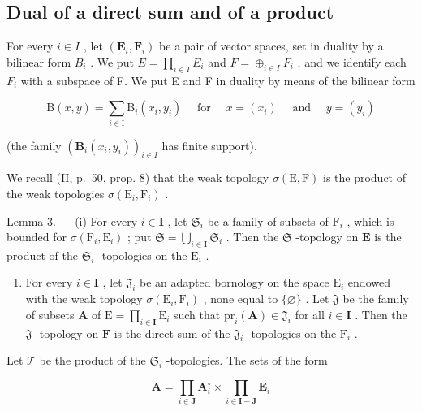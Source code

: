 \subsection{Dual of a direct sum and of a product}

For every \(i \in I\) , let \((\mathbf{E}_{i}, \mathbf{F}_{i})\) be a pair of vector spaces, set in duality by a bilinear form \(B_{i}\) . We put \(E = \prod_{i \in I} E_{i}\) and \(F = \oplus_{i \in I} F_{i}\) , and we identify each \(F_{i}\) with a subspace of F. We put E and F in duality by means of the bilinear form

\[
\mathrm{B} (x, y) = \sum_ {i \in \mathrm{I}} \mathrm{B} _ {i} \left(x _ {i}, y _ {i}\right) \quad \text { for } \quad x = \left(x _ {i}\right) \quad \text { and } \quad y = \left(y _ {i}\right)\tag{8}
\]

(the family \((\mathbf{B}_i(x_i, y_i))_{i \in I}\) has finite support).

We recall (II, p.~50, prop. 8) that the weak topology \(\sigma(\mathrm{E},\mathrm{F})\) is the product of the weak topologies \(\sigma(\mathrm{E}_i,\mathrm{F}_i)\) .

Lemma 3. --- (i) For every \(i \in \mathbf{I}\) , let \(\mathfrak{S}_i\) be a family of subsets of \(\mathrm{F}_i\) , which is bounded for \(\sigma(\mathrm{F}_i, \mathrm{E}_i)\) ; put \(\mathfrak{S} = \bigcup_{i \in \mathbf{I}} \mathfrak{S}_i\) . Then the \(\mathfrak{S}\) -topology on \(\mathbf{E}\) is the product of the \(\mathfrak{S}_i\) -topologies on the \(\mathrm{E}_i\) .

\begin{enumerate}
\def\labelenumi{(\roman{enumi})}
\setcounter{enumi}{1}
\tightlist
\item
  For every \(i \in \mathbf{I}\) , let \(\mathfrak{J}_i\) be an adapted bornology on the space \(\mathrm{E}_i\) endowed with the weak topology \(\sigma(\mathrm{E}_i, \mathrm{F}_i)\) , none equal to \(\{\varnothing\}\) . Let \(\mathfrak{J}\) be the family of subsets \(\mathbf{A}\) of \(\mathrm{E} = \prod_{i \in \mathbf{I}} \mathrm{E}_i\) such that \(\mathrm{pr}_i(\mathbf{A}) \in \mathfrak{J}_i\) for all \(i \in \mathbf{I}\) . Then the \(\mathfrak{J}\) -topology on \(\mathbf{F}\) is the direct sum of the \(\mathfrak{J}_i\) -topologies on the \(\mathrm{F}_i\) .
\end{enumerate}

Let \(\mathcal{T}\) be the product of the \(\mathfrak{S}_i\) -topologies. The sets of the form

\[
\mathbf {A} = \prod_ {i \in \mathbf {J}} \mathbf {A} _ {i} ^ {\circ} \times \prod_ {i \in \mathbf {I} - \mathbf {J}} \mathbf {E} _ {i}
\]

